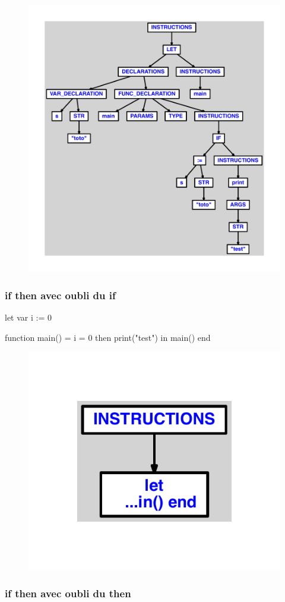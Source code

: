\documentclass{article}
\begin{document}
\begin{figure}[H]\centering\includegraphics[max width=\textwidth]{ast/ast_241.pdf}\end{figure}\subsubsection{if then avec oubli du if}
\begin{verbatimtab}
let
	var i := 0

	function main() =
		i = 0 then
			print("test")
in main() end
\end{verbatimtab}
\begin{figure}[H]\centering\includegraphics[max width=\textwidth]{ast/ast_242.pdf}\end{figure}\subsubsection{if then avec oubli du then}
\end{document}
